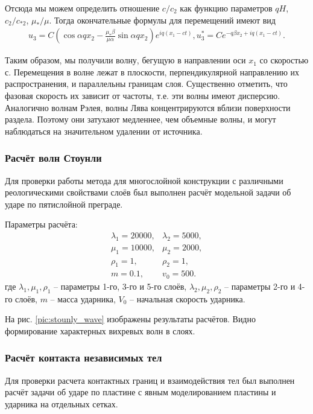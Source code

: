 Отсюда мы можем определить отношение $c/c_2$ как функцию параметров $qH$, $c_2/c_{*2}$, $\mu_*/\mu$.  Тогда окончательные формулы для перемещений имеют вид
\begin{eqnarray}
u_3 = C (\cos{\alpha q x_2} - \frac{\mu_* \beta}{\mu \alpha} \sin{\alpha q x_2}) e^{iq(x_1-ct)},
u_3^* = C e^{-q \beta x_2 + i q (x_1 - ct)}.
\end{eqnarray}

Таким образом, мы получили волну, бегущую в направлении оси $x_1$ со скоростью $с$. Перемещения в волне лежат в плоскости, перпендикулярной направлению их распространения, и параллельны границам слоя. Существенно отметить, что фазовая скорость их зависит от частоты, т.е. эти волны имеют дисперсию. Аналогично волнам Рэлея, волны Лява концентрируются вблизи поверхности раздела. Поэтому они затухают медленнее, чем объемные волны, и могут наблюдаться на значительном удалении от источника.


\clearpage
\newpage

\subsubsection{Расчёт волн Стоунли}

Для проверки работы метода для многослойной конструкции с различными реологическими свойствами слоёв был выполнен расчёт модельной задачи об ударе по пятислойной преграде.

Параметры расчёта:
\begin{eqnarray}
\lambda_1=20000, & \lambda_2=5000, \nonumber\\
\mu_1=10000, & \mu_2=2000, \nonumber\\
\rho_1=1, & \rho_2=1, \nonumber\\
m = 0.1, & v_0 = 500.
\end{eqnarray}
где $\lambda_1, \mu_1, \rho_1$ -- параметры 1-го, 3-го и 5-го слоёв, $\lambda_2, \mu_2, \rho_2$ -- параметры 2-го и 4-го слоёв, $m$ -- масса ударника, $V_0$ -- начальная скорость ударника.

На рис. \ref{pic:stounly_wave} изображены результаты расчётов. Видно формирование характерных вихревых волн в слоях.


\subsubsection{Расчёт контакта независимых тел}

Для проверки расчета контактных границ и взаимодействия тел был выполнен расчёт задачи об ударе по пластине с явным моделированием пластины и ударника на отдельных сетках.


